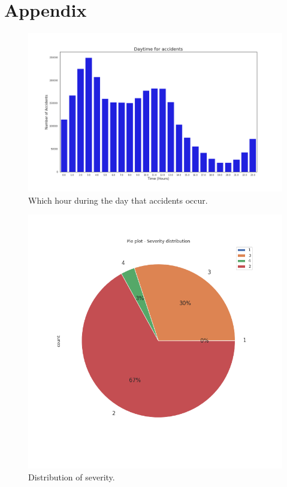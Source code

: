 \documentclass[../main.tex]{subfiles}
\begin{document}
\newpage
\section{Appendix}

\begin{figure}[H]
\centering
\includegraphics[width=15cm]{Images/accident_hours.png}
\caption{Which hour during the day that accidents occur.}
\label{fig:accident_hour}
\end{figure}

\begin{figure}[H]
\centering
\includegraphics[width=15cm]{Images/pie_severity_dist.png}
\caption{Distribution of severity.}
\label{fig:pie_severity}
\end{figure}
\end{document}
